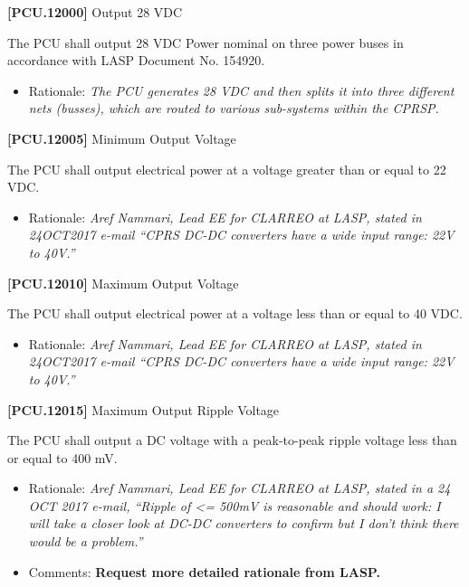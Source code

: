 \documentclass[12pt,oneside,oldfontcommands]{memoir}
\begin{document}
\textbf{[PCU.12000]} Output 28 \gls{VDC}

The \gls{PCU} shall output 28 \gls{VDC} Power nominal on three power buses in accordance with \gls{LASP} Document No. 154920.

\begin{itemize}
\item{} Rationale: \emph{The PCU generates 28 VDC and then splits it into three different nets (busses), which are routed to various sub-systems within the CPRSP.}

\end{itemize}

\textbf{[PCU.12005]} Minimum Output Voltage

The \gls{PCU} shall output electrical power at a voltage greater than or equal to 22 \gls{VDC}.

\begin{itemize}
\item{} Rationale: \emph{Aref Nammari, Lead EE for CLARREO at LASP, stated in 24OCT2017 e-mail ``CPRS DC-DC converters have a wide input range: 22V to 40V.''}

\end{itemize}

\textbf{[PCU.12010]} Maximum Output Voltage

The \gls{PCU} shall output electrical power at a voltage less than or equal to 40 \gls{VDC}.

\begin{itemize}
\item{} Rationale: \emph{Aref Nammari, Lead EE for CLARREO at LASP, stated in 24OCT2017 e-mail ``CPRS DC-DC converters have a wide input range: 22V to 40V.''}

\end{itemize}

\textbf{[PCU.12015]} Maximum Output Ripple Voltage

The \gls{PCU} shall output a DC voltage with a peak-to-peak ripple voltage less than or equal to 400 mV.

\begin{itemize}
\item{} Rationale: \emph{Aref Nammari, Lead EE for CLARREO at LASP, stated in a 24 OCT 2017 e-mail, ``Ripple of <= 500mV is reasonable and should work: I will take a closer look at DC-DC converters to confirm but I don't think there would be a problem.''}

\item{} Comments: \textbf{Request more detailed rationale from LASP.}

\end{itemize}
\end{document}
